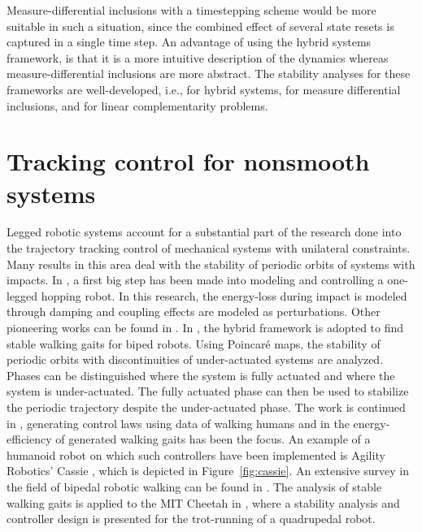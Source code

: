 \documentclass[../DC2017114Bouma.tex]{subfiles}
\begin{document}
Measure-differential inclusions with a timestepping scheme would be more suitable in such a situation, since the combined effect of several state resets is captured in a single time step. An advantage of using the hybrid systems framework, is that it is a more intuitive description of the dynamics whereas measure-differential inclusions are more abstract. The stability analyses for these frameworks are well-developed, i.e., \cite{Ye1998,Lygeros2003,Goebel2009} for hybrid systems, \cite{Pereira2004,Brogliato2004,Leine2008} for measure differential inclusions, and \cite{Brogliato1999,Camlibel2006,Camlibel2007} for linear complementarity problems.

\section{Tracking control for nonsmooth systems}
Legged robotic systems account for a substantial part of the research done into the trajectory tracking control of mechanical systems with unilateral constraints. Many results in this area deal with the stability of periodic orbits of systems with impacts. In \cite{Raibert1984}, a first big step has been made into modeling and controlling a one-legged hopping robot. In this research, the energy-loss during impact is modeled through damping and coupling effects are modeled as perturbations. Other pioneering works can be found in \cite{Lebaudy1993,Michalska1996,Gregorio1997}. In \cite{Grizzle2001,Morris2009}, the hybrid framework is adopted to find stable walking gaits for biped robots. Using Poincar\'{e} maps, the stability of periodic orbits with discontinuities of under-actuated systems are analyzed. Phases can be distinguished where the system is fully actuated and where the system is under-actuated. The fully actuated phase can then be used to stabilize the periodic trajectory despite the under-actuated phase. The work is continued in \cite{Ames2014}, generating control laws using data of walking humans and in \cite{Reher2016} the energy-efficiency of generated walking gaits has been the focus. An example of a humanoid robot on which such controllers have been implemented is Agility Robotics' Cassie \cite{Cassie}, which is depicted in Figure~\ref{fig:cassie}. An extensive survey in the field of bipedal robotic walking can be found in \cite{Grizzle2014}. The analysis of stable walking gaits is applied to the MIT Cheetah in \cite{Hyun2014}, where a stability analysis and controller design is presented for the trot-running of a quadrupedal robot.  
\end{document}
